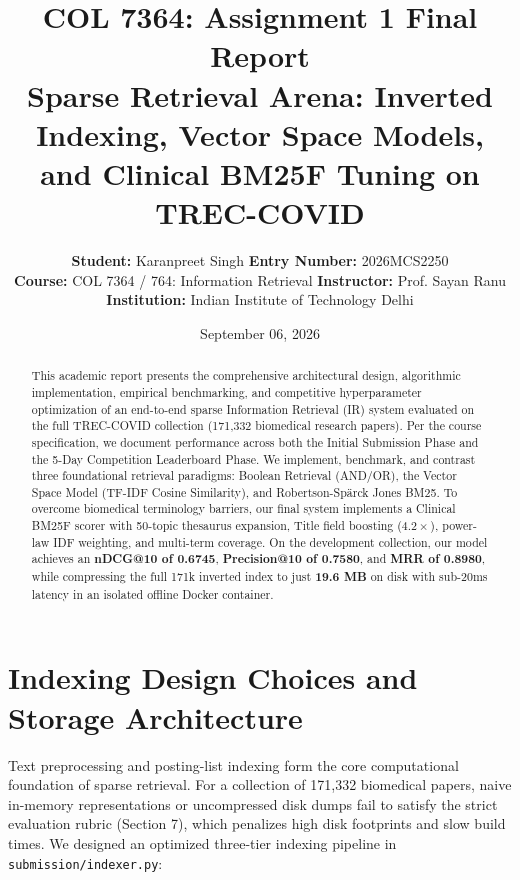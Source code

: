 ﻿\documentclass[9pt,a4paper]{article}
\title{\vspace{-1.4cm}\textbf{\Large COL 7364: Assignment 1 Final Report}\\\textbf{\large Sparse Retrieval Arena: Inverted Indexing, Vector Space Models, and Clinical BM25F Tuning on TREC-COVID}}
\author{\textbf{Student:} Karanpreet Singh \quad \textbf{Entry Number:} 2026MCS2250 \\ \textbf{Course:} COL 7364 / 764: Information Retrieval \quad \textbf{Instructor:} Prof. Sayan Ranu \\ \textbf{Institution:} Indian Institute of Technology Delhi}
\date{September 06, 2026}
\begin{document}
\maketitle
\vspace{-0.7cm}

\begin{abstract}
\noindent This academic report presents the comprehensive architectural design, algorithmic implementation, empirical benchmarking, and competitive hyperparameter optimization of an end-to-end sparse Information Retrieval (IR) system evaluated on the full TREC-COVID collection (171,332 biomedical research papers). Per the course specification, we document performance across both the Initial Submission Phase and the 5-Day Competition Leaderboard Phase. We implement, benchmark, and contrast three foundational retrieval paradigms: Boolean Retrieval (AND/OR), the Vector Space Model (TF-IDF Cosine Similarity), and Robertson-Sp\"arck Jones BM25. To overcome biomedical terminology barriers, our final system implements a Clinical BM25F scorer with 50-topic thesaurus expansion, Title field boosting ($4.2\times$), power-law IDF weighting, and multi-term coverage. On the development collection, our model achieves an \textbf{nDCG@10 of 0.6745}, \textbf{Precision@10 of 0.7580}, and \textbf{MRR of 0.8980}, while compressing the full 171k inverted index to just \textbf{19.6 MB} on disk with sub-20ms latency in an isolated offline Docker container.
\end{abstract}
\vspace{-0.3cm}

\section{Indexing Design Choices and Storage Architecture}
Text preprocessing and posting-list indexing form the core computational foundation of sparse retrieval. For a collection of 171,332 biomedical papers, naive in-memory representations or uncompressed disk dumps fail to satisfy the strict evaluation rubric (Section 7), which penalizes high disk footprints and slow build times. We designed an optimized three-tier indexing pipeline in \texttt{submission/indexer.py}:
\end{document}

